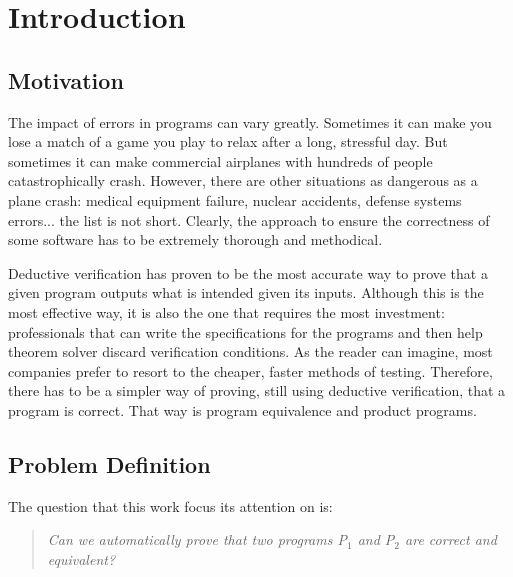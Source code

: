 
%

\chapter{Introduction}
\label{cha:introduction}

\section{Motivation} 

The impact of errors in programs can vary greatly.
Sometimes it can make you lose a match of a game you play to relax after a long, stressful day.
But sometimes it can make commercial airplanes with hundreds of people catastrophically crash.
However, there are other situations as dangerous as a plane crash: medical equipment failure, nuclear accidents, defense systems errors... the list is not short.
Clearly, the approach to ensure the correctness of some software has to be extremely thorough and methodical.

Deductive verification has proven to be the most accurate way to prove that a given program outputs what is intended given its inputs.
Although this is the most effective way, it is also the one that requires the most investment: professionals that can write the specifications for the programs and then help theorem solver discard verification conditions.
As the reader can imagine, most companies prefer to resort to the cheaper, faster methods of testing.
Therefore, there has to be a simpler way of proving, still using deductive verification, that a program is correct.
That way is program equivalence and product programs.


\section{Problem Definition}

The question that this work focus its attention on is:

\begin{quote}
    \centering
    \emph{Can we automatically prove that two programs P$_1$ and P$_2$ are correct and equivalent?}
\end{quote}

